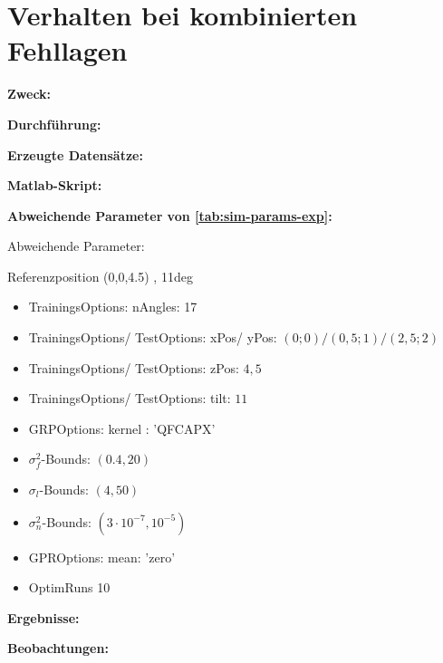 %

\section{Verhalten bei kombinierten Fehllagen}\label{sec:exp6}

\textbf{Zweck:}

\textbf{Durchführung:}

\textbf{Erzeugte Datensätze:}

\textbf{Matlab-Skript:}

\textbf{Abweichende Parameter von \autoref{tab:sim-params-exp}:}

Abweichende Parameter:

Referenzposition (0,0,4.5) , 11deg 

\begin{itemize}
	\item TrainingsOptions: nAngles: 17
	\item TrainingsOptions/ TestOptions: xPos/ yPos: $(0;0)/(0,5;1)/(2,5;2)$
	\item TrainingsOptions/ TestOptions: zPos: $4,5$
	\item TrainingsOptions/ TestOptions: tilt: $11$
	\item GRPOptions: kernel : 'QFCAPX'
	\item $\sigma_f^2$-Bounds: $(0.4,20)$
	\item $\sigma_l$-Bounds: $(4,50)$
	\item $\sigma_n^2$-Bounds: $(3\cdot10^{-7},10^{-5})$
	\item GPROptions: mean: 'zero'
	\item OptimRuns 10
\end{itemize}

\textbf{Ergebnisse:}

\textbf{Beobachtungen:}


